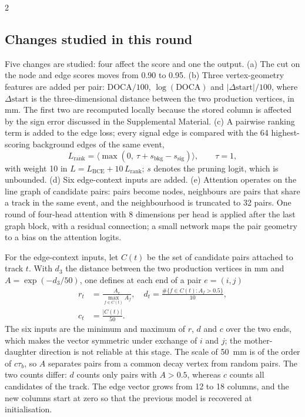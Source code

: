 \documentclass[10pt]{article}
\begin{document}
\begin{multicols}{2}
\subsection{Changes studied in this round}

Five changes are studied: four affect the score and one the output. (a) The cut on the node and edge scores moves from 0.90 to 0.95. (b) Three vertex-geometry features are added per pair: $\mathrm{DOCA}/100$, $\log(\mathrm{DOCA})$ and $|\Delta \mathrm{start}|/100$, where $\Delta\mathrm{start}$ is the three-dimensional distance between the two production vertices, in mm. The first two are recomputed locally because the stored column is affected by the sign error discussed in the Supplemental Material. (c) A pairwise ranking term is added to the edge loss; every signal edge is compared with the 64 highest-scoring background edges of the same event,
\begin{equation}
L_{\mathrm{rank}}=\big\langle \max(0,\ \tau+s_{\mathrm{bkg}}-s_{\mathrm{sig}})\big\rangle,\qquad \tau=1,
\end{equation}
with weight 10 in $L=L_{\mathrm{BCE}}+10\,L_{\mathrm{rank}}$; $s$ denotes the pruning logit, which is unbounded. (d) Six edge-context inputs are added. (e) Attention operates on the line graph of candidate pairs: pairs become nodes, neighbours are pairs that share a track in the same event, and the neighbourhood is truncated to 32 pairs. One round of four-head attention with 8 dimensions per head is applied after the last graph block, with a residual connection; a small network maps the pair geometry to a bias on the attention logits.

For the edge-context inputs, let $C(t)$ be the set of candidate pairs attached to track $t$. With $d_3$ the distance between the two production vertices in mm and $A=\exp(-d_3/50)$, one defines at each end of a pair $e=(i,j)$
\begin{equation}
\begin{aligned}
r_t&=\frac{A_e}{\max_{f\in C(t)}A_f},\quad
d_t=\frac{\#\{f\in C(t): A_f>0.5\}}{10},\\
c_t&=\frac{|C(t)|}{50}.
\end{aligned}
\end{equation}
The six inputs are the minimum and maximum of $r$, $d$ and $c$ over the two ends, which makes the vector symmetric under exchange of $i$ and $j$; the mother-daughter direction is not reliable at this stage. The scale of 50~mm is of the order of $c\tau_b$, so $A$ separates pairs from a common decay vertex from random pairs. The two counts differ: $d$ counts only pairs with $A>0.5$, whereas $c$ counts all candidates of the track. The edge vector grows from 12 to 18 columns, and the new columns start at zero so that the previous model is recovered at initialisation.


\end{multicols}
\end{document}
